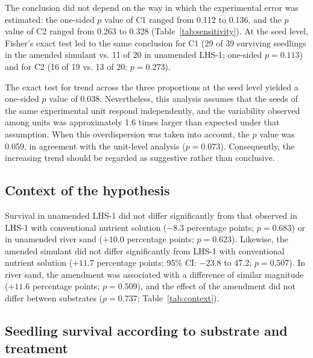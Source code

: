 \documentclass[11pt]{article}
\begin{document}
The conclusion did not depend on the way in which the experimental error was estimated: the one-sided $p$ value of C1 ranged from 0.112 to 0.136, and the $p$ value of C2 ranged from 0.263 to 0.328 (Table~\ref{tab:sensitivity}). At the seed level, Fisher's exact test led to the same conclusion for C1 (29 of 39 surviving seedlings in the amended simulant vs. 11 of 20 in unamended LHS-1; one-sided $p = 0.113$) and for C2 (16 of 19 vs. 13 of 20; $p = 0.273$).

The exact test for trend across the three proportions at the seed level yielded a one-sided $p$ value of 0.038. Nevertheless, this analysis assumes that the seeds of the same experimental unit respond independently, and the variability observed among units was approximately 1.6 times larger than expected under that assumption. When this overdispersion was taken into account, the $p$ value was 0.059, in agreement with the unit-level analysis ($p = 0.073$). Consequently, the increasing trend should be regarded as suggestive rather than conclusive.

\begin{table}[H]
\caption{\capTabD}\label{tab:sensitivity}
\end{table}

\subsection{Context of the hypothesis}

Survival in unamended LHS-1 did not differ significantly from that observed in LHS-1 with conventional nutrient solution ($-8.3$ percentage points; $p = 0.683$) or in unamended river sand ($+10.0$ percentage points; $p = 0.623$). Likewise, the amended simulant did not differ significantly from LHS-1 with conventional nutrient solution ($+11.7$ percentage points; 95\% CI: $-23.8$ to 47.2; $p = 0.507$). In river sand, the amendment was associated with a difference of similar magnitude ($+11.6$ percentage points; $p = 0.509$), and the effect of the amendment did not differ between substrates ($p = 0.737$; Table~\ref{tab:context}).

\begin{table}[H]
\caption{\capTabE}\label{tab:context}
\end{table}

\subsection{Seedling survival according to substrate and treatment}
\end{document}
